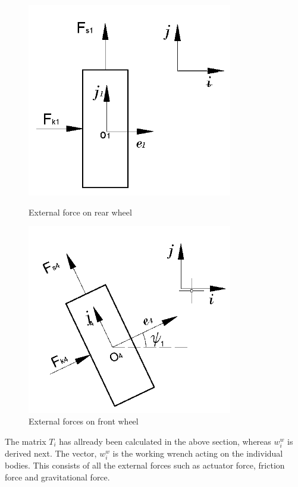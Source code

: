 {\begin{figure}
	\begin{minipage}[t]{0.5\textwidth}
		\centering
		\includegraphics[width=0.8\textwidth]{Chapter4/fig/ForceWheel1}
		\caption{External force on rear wheel}\label{fig:ForceRearWheel}
	\end{minipage}
	\hfill
	\begin{minipage}[t]{0.5\textwidth}
		\centering
		\includegraphics[width=0.8\textwidth]{Chapter4/fig/ForceWheel2}
		\caption{External forces on front wheel }\label{fig:ForceFrontWheel}
	\end{minipage}
\end{figure} 
The matrix $T_i$ has allready been calculated in the above section, whereas $w_i^w$ is derived next. The vector, $w_i^w$ is the working wrench acting on the individual bodies. This consists of all the external forces such as actuator force, friction force and gravitational force.
}
